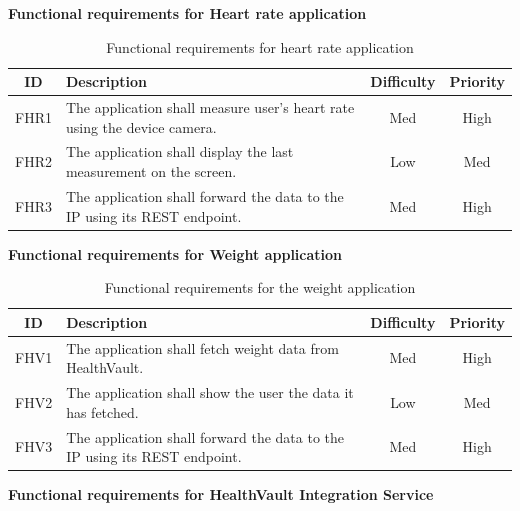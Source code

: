 \textbf{Functional requirements for Heart rate application}

\begin{table}[H]
\begin{center}
\begin{tabular}{ | c | p{9cm} | c | c |}
  \hline
  ID & Description & Difficulty & Priority\\
  \hline\noalign{\smallskip}\noalign{\smallskip}\hline
  FHR1	& The application shall measure user's heart rate using the device camera.    & Med	& High \\
  FHR2	& The application shall display the last measurement on the screen.          & Low	& Med \\
  FHR3	& The application shall forward the data to the IP using its REST endpoint.  & Med	& High \\
  \hline
\end{tabular}
\end{center}
\caption{Functional requirements for heart rate application}
\label{table:reqheartrate}
\end{table}

\textbf{Functional requirements for Weight application}

\begin{table}[H]
\begin{center}
\begin{tabular}{ | c | p{9cm} | c | c |}
  \hline
  ID & Description & Difficulty & Priority\\
  \hline\noalign{\smallskip}\noalign{\smallskip}\hline
  FHV1	& The application shall fetch weight data from HealthVault.						      & Med	& High \\
  FHV2	& The application shall show the user the data it has fetched.              & Low	& Med \\
  FHV3	& The application shall forward the data to the IP using its REST endpoint. & Med	& High \\
  \hline
\end{tabular}
\end{center}
\caption{Functional requirements for the weight application}
\label{table:reqweight}
\end{table}

\textbf{Functional requirements for HealthVault Integration Service}

